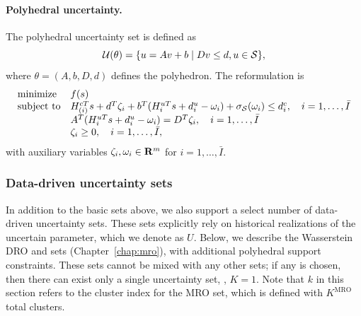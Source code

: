 \paragraph{Polyhedral uncertainty.}
The polyhedral uncertainty set is defined as
$${\mathcal{U}}(\theta) = \{ u = Av+b \mid Dv \leq d, u \in \mathcal{S}\},$$
where $\theta = (A,b,D,d)$ defines the polyhedron.
The reformulation is 
\begin{equation}
	\label{eq:poly_max}
	\begin{array}{ll}
		\mbox{minimize} & f(s)\\
		\mbox{subject to} & H^{cT}_{(i)}s + d^T\zeta_i + b^T( H_i^{uT}s + d_i^u-\omega_i) + \sigma_{\mathcal{S}}(\omega_i) \le d_i^c, \quad i = 1,\dots,\bar{I}\\
		& A^T(H_i^{uT}s + d_i^u-\omega_i) = D^T\zeta_i , \quad i = 1,\dots,\bar{I}\\
		& \zeta_i \geq 0, \quad i = 1,\dots,\bar{I},
	\end{array}
\end{equation}
with auxiliary variables $\zeta_i, \omega_i \in {\mathbf R}^m$ for $i = 1,\dots,\bar{I}$. 


\subsubsection{Data-driven uncertainty sets}
In addition to the basic sets above, we also support a select number of data-driven uncertainty sets. These sets explicitly rely on historical realizations of the uncertain parameter, which we denote as $U$. 
Below, we describe the Wasserstein \gls{DRO} and  sets (Chapter~\ref{chap:mro}), with additional polyhedral support constraints. These sets cannot be mixed with any other sets; if any is chosen, then there can exist only a single uncertainty set, \ie, $K=1$. Note that $k$ in this section refers to the cluster index for the \gls{MRO} set, which is defined with $K^{\text{MRO}}$ total clusters.
